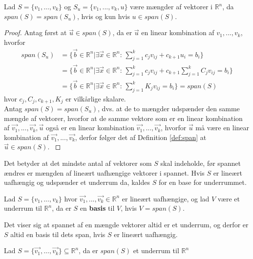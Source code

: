 \begin{stn}
Lad $S = \{v_1,...,v_k\}$ og $S_u = \{v_1,...,v_k, u\}$ være mængder af vektorer i $\mathds{R}^n$, da $span(S) = span(S_u)$, hvis og kun hvis $u \in span(S)$.
\end{stn}
\begin{proof}
Antag først at $\vec{u} \in span(S)$, da er $\vec{u}$ en linear kombination af $v_1,..., v_k$, hvorfor
\begin{align*}
span(S_u) &= \{ \vec{b} \in \mathds{R}^n| \exists \vec{x} \in \mathds{R}^n: \, \sum_{j=1}^k c_j v_{ij} + c_{k+1} u_i  = b_i\}
\\&= \{ \vec{b} \in \mathds{R}^n| \exists \vec{x} \in \mathds{R}^n: \, \sum_{j=1}^k c_j v_{ij} + c_{k+1} \sum_{j=1}^k C_j v_{ij}  = b_i\}
\\&= \{ \vec{b} \in \mathds{R}^n| \exists \vec{x} \in \mathds{R}^n: \, \sum_{j=1}^k K_j v_{ij}  = b_i\} = span(S)
\end{align*}
hvor $c_j, C_j, c_{k+1}, K_j$ er vilkårlige skalare.
\\ Antag $span(S) = span(S_u)$, dvs. at de to mængder udspænder den samme mængde af vektorer, hvorfor at de samme vektore som er en linear kombination af $\vec{v_1},...,\vec{v_k}, \vec{u}$ også er en linear kombination $\vec{v_1},..., \vec{v_k}$, hvorfor $\vec{u}$ må være en linear kombination af  $\vec{v_1},..., \vec{v_k}$, derfor følger det af Definition \ref{def:span} at $\vec{u} \in span(S).$
\label{stn:akvivalentespan}
\end{proof}
Det betyder at det mindste antal af vektorer som $S$ skal indeholde, før spannet ændres er mængden af lineært uafhængige vektorer i spannet.
Hvis $S$ er lineært uafhængig og udspænder et underrum da, kaldes $S$ for en base for underrummet.
\begin{defn}[Basis]
Lad $S =\{v_1,...,v_k\}$ hvor $\vec{v_1},...,\vec{v_k} \in \mathds{R}^n$ er lineært uafhængige, og lad $V$ være et underrum til $\mathds{R}^n$, da er $S$ en \textbf{basis} til $V$, hvis $V = span(S)$.
\label{def:basis}
\end{defn}
Det viser sig at spannet af en mængde vektorer altid er et underrum, og derfor er $S$ altid en basis til dets span, hvis $S$ er lineært uafhængig.
\begin{stn}
Lad $S=\{\vec{v_1},...,\vec{v_k}\} \subseteq \mathds{R}^n$, da er $span(S)$ et underrum til $\mathds{R}^n$
\label{stn:spanunderrum}
\end{stn}
